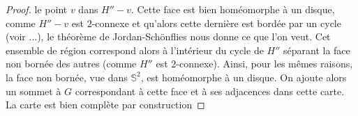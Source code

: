 \documentclass{scrartcl}
\begin{document}
\begin{flushleft}
\begin{proof}
    le point $v$ dans $H'' - v$. Cette face est bien homéomorphe à un disque, comme $H'' - v$ est $2$-connexe et qu'alors
    cette dernière est bordée par un cycle (voir ...), le théorème de Jordan-Schönflies nous donne ce que l'on veut.
    Cet ensemble de région correspond alors à l'intérieur du cycle de $H''$
    séparant la face non bornée des autres (comme $H''$ est $2$-connexe). Ainsi, pour les mêmes raisons, la face non bornée, vue dans $\mathbb{S}^2$,
    est homéomorphe à un disque. On ajoute alors un sommet à $G$ correspondant à cette face et à ses adjacences dans cette carte.
    La carte est bien complète par construction

\end{proof}


\end{flushleft}
\end{document}
